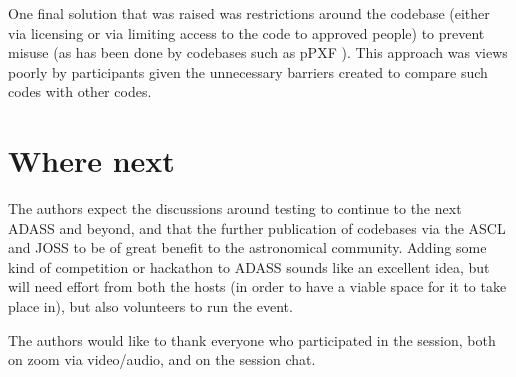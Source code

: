 \documentclass[11pt,twoside]{article}
\begin{document}
One final solution that was raised was restrictions around the codebase (either
via licensing or via limiting access to the code to approved people) to prevent
misuse (as has been done by codebases such as pPXF \citep{2017MNRAS.466..798C}).
This approach was views poorly by participants given the unnecessary barriers
created to compare such codes with other codes.

\section{Where next}
The authors expect the discussions around testing to continue to the next ADASS
and beyond, and that the further publication of codebases via the ASCL and JOSS
to be of great benefit to the astronomical community. Adding some kind of
competition or hackathon to ADASS sounds like an excellent idea, but will need
effort from both the hosts (in order to have a viable space for it to take place
in), but also volunteers to run the event.


\acknowledgments The authors would like to thank everyone who participated in
the session, both on zoom via video/audio, and on the session chat.





\end{document}
